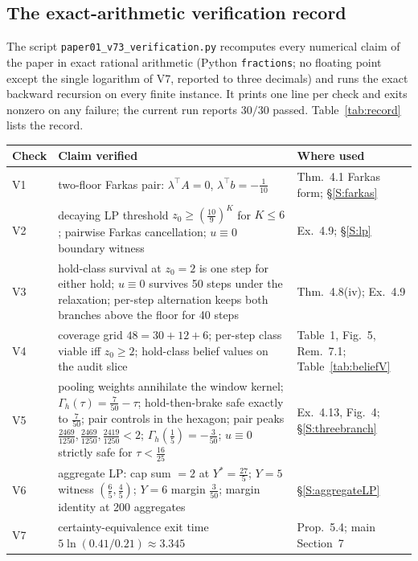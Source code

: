 \subsection{The exact-arithmetic verification record}\label{S:record}
The script \texttt{paper01\_v73\_verification.py} recomputes every numerical claim of the paper in exact rational arithmetic (Python \texttt{fractions}; no floating point except the single logarithm of V7, reported to three decimals) and runs the exact backward recursion on every finite instance. It prints one line per check and exits nonzero on any failure; the current run reports $30/30$ passed. Table~\ref{tab:record} lists the record.

\begin{table}[htbp]
\centering\small
\begin{tabularx}{\textwidth}{@{}l>{\raggedright\arraybackslash}X>{\raggedright\arraybackslash}p{}@{}}
\toprule
Check & Claim verified & Where used\\
\midrule
V1 & two-floor Farkas pair: $\lambda^\top A=0$, $\lambda^\top b=-\tfrac1{10}$ & Thm.~4.1 Farkas form; \S\ref{S:farkas}\\
V2 & decaying LP threshold $z_0\ge(\tfrac{10}9)^K$ for $K\le6$; pairwise Farkas cancellation; $u\equiv0$ boundary witness & Ex.~4.9; \S\ref{S:lp}\\
V3 & hold-class survival at $z_0=2$ is one step for either hold; $u\equiv0$ survives 50 steps under the relaxation; per-step alternation keeps both branches above the floor for 40 steps & Thm.~4.8(iv); Ex.~4.9\\
V4 & coverage grid $48=30+12+6$; per-step class viable iff $z_0\ge2$; hold-class belief values on the audit slice & Table~1, Fig.~5, Rem.~7.1; Table~\ref{tab:beliefV}\\
V5 & pooling weights annihilate the window kernel; $\Gamma_h(\tau)=\tfrac7{50}-\tau$; hold-then-brake safe exactly to $\tfrac7{50}$; pair controls in the hexagon; pair peaks $\tfrac{2469}{1250},\tfrac{2469}{1250},\tfrac{2419}{1250}<2$; $\Gamma_h(\tfrac15)=-\tfrac3{50}$; $u\equiv0$ strictly safe for $\tau<\tfrac{16}{25}$ & Ex.~4.13, Fig.~4; \S\ref{S:threebranch}\\
V6 & aggregate LP: cap sum $=2$ at $Y^*=\tfrac{27}5$; $Y=5$ witness $(\tfrac65,\tfrac45)$; $Y=6$ margin $\tfrac3{50}$; margin identity at 200 aggregates & \S\ref{S:aggregateLP}\\
V7 & certainty-equivalence exit time $5\ln(0.41/0.21)\approx3.345$ & Prop.~5.4; main Section~7\\

\end{tabularx}
\end{table}

